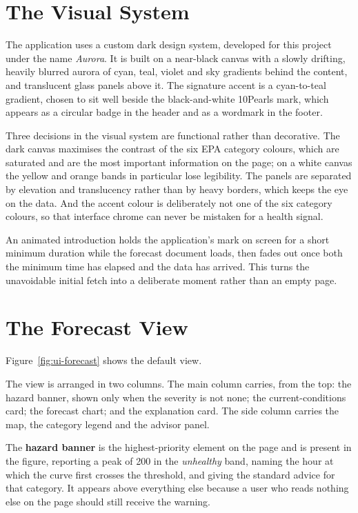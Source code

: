 \section{The Visual System}
The application uses a custom dark design system, developed for this project
under the name \emph{Aurora}. It is built on a near-black canvas with a slowly
drifting, heavily blurred aurora of cyan, teal, violet and sky gradients behind
the content, and translucent glass panels above it. The signature accent is a
cyan-to-teal gradient, chosen to sit well beside the black-and-white 10Pearls
mark, which appears as a circular badge in the header and as a wordmark in the
footer.

Three decisions in the visual system are functional rather than decorative. The
dark canvas maximises the contrast of the six EPA category colours, which are
saturated and are the most important information on the page; on a white canvas
the yellow and orange bands in particular lose legibility. The panels are
separated by elevation and translucency rather than by heavy borders, which keeps
the eye on the data. And the accent colour is deliberately not one of the six
category colours, so that interface chrome can never be mistaken for a health
signal.

An animated introduction holds the application's mark on screen for a short
minimum duration while the forecast document loads, then fades out once both the
minimum time has elapsed and the data has arrived. This turns the unavoidable
initial fetch into a deliberate moment rather than an empty page.

\section{The Forecast View}
Figure~\ref{fig:ui-forecast} shows the default view.


The view is arranged in two columns. The main column carries, from the top: the
hazard banner, shown only when the severity is not none; the current-conditions
card; the forecast chart; and the explanation card. The side column carries the
map, the category legend and the advisor panel.

The \textbf{hazard banner} is the highest-priority element on the page and is
present in the figure, reporting a peak of 200 in the \emph{unhealthy} band,
naming the hour at which the curve first crosses the threshold, and giving the
standard advice for that category. It appears above everything else because a
user who reads nothing else on the page should still receive the warning.

